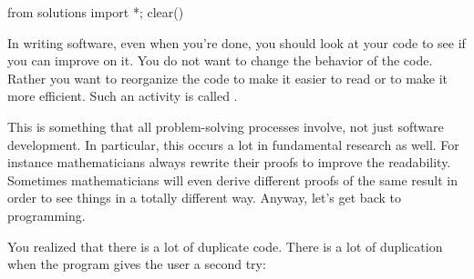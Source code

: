 \begin{python0}
from solutions import *; clear()
\end{python0}

In writing software, even when you're done, you should
look at your code to see if you can improve on it. You do not want to
change the behavior of the code. Rather you want to reorganize the code
to make it easier to read or to make it more efficient. Such an activity
is called .

This is something that all problem-solving processes involve, not just
software development. In particular, this occurs a lot in fundamental
research as well. For instance mathematicians always rewrite their
proofs to improve the readability. Sometimes mathematicians will even
derive different proofs of the same result in order to see things in a
totally different way. Anyway, let's get back to
programming.

You realized that there is a lot of duplicate code. There is a lot of
duplication when the program gives the user a second try:

